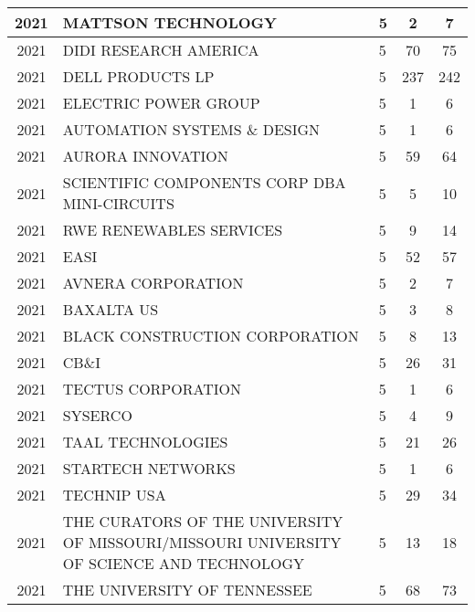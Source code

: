 \documentclass{article}%
\begin{document}
\begin{longtable}{c|p{20em}|p{5em}|c|c}
\hline%
2021&MATTSON TECHNOLOGY&5&2&7\\%
\hline%
2021&DIDI RESEARCH AMERICA&5&70&75\\%
\hline%
2021&DELL PRODUCTS LP&5&237&242\\%
\hline%
2021&ELECTRIC POWER GROUP&5&1&6\\%
\hline%
2021&AUTOMATION SYSTEMS \& DESIGN&5&1&6\\%
\hline%
2021&AURORA INNOVATION&5&59&64\\%
\hline%
2021&SCIENTIFIC COMPONENTS CORP DBA MINI{-}CIRCUITS&5&5&10\\%
\hline%
2021&RWE RENEWABLES SERVICES&5&9&14\\%
\hline%
2021&EASI&5&52&57\\%
\hline%
2021&AVNERA CORPORATION&5&2&7\\%
\hline%
2021&BAXALTA US&5&3&8\\%
\hline%
2021&BLACK CONSTRUCTION CORPORATION&5&8&13\\%
\hline%
2021&CB\&I&5&26&31\\%
\hline%
2021&TECTUS CORPORATION&5&1&6\\%
\hline%
2021&SYSERCO&5&4&9\\%
\hline%
2021&TAAL TECHNOLOGIES&5&21&26\\%
\hline%
2021&STARTECH NETWORKS&5&1&6\\%
\hline%
2021&TECHNIP USA&5&29&34\\%
\hline%
2021&THE CURATORS OF THE UNIVERSITY OF MISSOURI/MISSOURI UNIVERSITY OF SCIENCE AND TECHNOLOGY&5&13&18\\%
\hline%
2021&THE UNIVERSITY OF TENNESSEE&5&68&73\\%
\hline%
\end{longtable}

%
\end{document}

